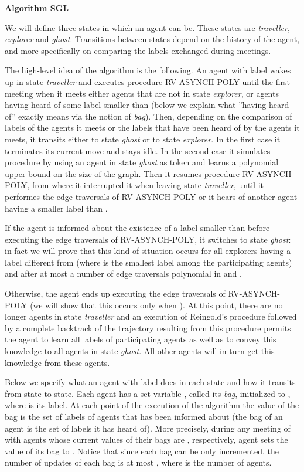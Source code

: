 \documentclass [11pt] {article}
\begin{document}
\noindent
{\bf Algorithm SGL}


{We will define three states in which an agent can be. These states are {\em traveller}, {\em explorer}
and {\em ghost}. Transitions between states depend on the history of the agent, and more specifically on comparing the labels exchanged during meetings.} 

{The high-level idea of the algorithm is the following. An agent  with label  wakes up in state {\em traveller} and executes procedure RV-ASYNCH-POLY until the first meeting when it meets either agents that are not in state {\em explorer}, or agents having heard of some label smaller than  (below we explain what ''having heard of'' exactly means via the notion of {\em bag}).}
{Then, depending on the comparison of labels of the agents it meets or the labels that have been heard of by the agents it meets, it transits either to state {\em ghost} or to state {\em explorer}. In the first case it terminates its current move and stays idle.
In the second case it simulates procedure  by using an agent in state {\em ghost} as token and learns a polynomial upper bound  on the size  of the graph. Then it resumes procedure RV-ASYNCH-POLY, from where it interrupted it when leaving state {\em traveller}, until it performes the  edge traversals of RV-ASYNCH-POLY or it hears of another agent having a smaller label than .}

{If the agent is informed about the existence of a label smaller than  before executing the  edge traversals of RV-ASYNCH-POLY, it switches to state {\em ghost}: in fact we will prove that this kind of situation occurs for all explorers having a label different from  (where  is the smallest label among the participating agents) and after at most a number of edge traversals polynomial in  and .} 

{Otherwise, the agent ends up executing the  edge traversals of RV-ASYNCH-POLY (we will show that this occurs only when ).
At this point, there are no longer agents in state {\em traveller} and an execution of Reingold's procedure
followed by a complete backtrack of the trajectory resulting from this procedure permits the agent to learn all labels of participating agents as well as to convey this knowledge to all agents in state {\em ghost}.
All other agents will in turn get this knowledge from these agents.}


Below we specify what an agent  with label 
does in each state and how it transits from state to state. Each agent has a set variable , called its {\em bag}, initialized to , where  is its label. At each point of the execution of the algorithm  the value of the bag is the set of labels of agents that  has been informed about {(the bag of an agent is the set of labels it has heard of)}. More precisely, during any meeting of  with agents whose current values of their bags are ,
respectively, agent  sets the value of its bag  to .  Notice that since each bag can be only incremented, the number of updates of each bag
is at most , where  is the number of agents.
\end{document}
